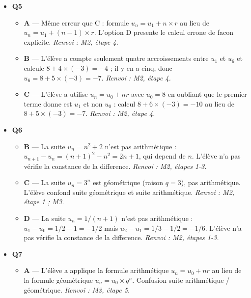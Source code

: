 \begin{itemize}
\begin{itemize}
    \item \textbf{B} — L'élève a donne une expression dependant de $n$ comme raison. La raison d'une suite arithmétique est un réel constant, pas une expression variable. \emph{Renvoi : M2, étape 3.}
    \item \textbf{D} — L'élève calcule $u_1=4 \times 1-7=-3$ et confond ce terme avec la raison. Or $u_0=-7$ et $u_1-u_0=-3-(-7)=4$. \emph{Renvoi : M2, étape 3.}
  \end{itemize}
  \item \textbf{Q5}
  \begin{itemize}
    \item \textbf{A} — Même erreur que C : formule $u_n = u_1 + n \times r$ au lieu de $u_n = u_1 + (n-1) \times r$. L'option D presente le calcul errone de facon explicite. \emph{Renvoi : M2, étape 4.}
    \item \textbf{B} — L'élève a compte seulement quatre accroissements entre $u_1$ et $u_6$ et calcule $8+4\times(-3)=-4$ ; il y en a cinq, donc $u_6=8+5\times(-3)=-7$. \emph{Renvoi : M2, étape 4.}
    \item \textbf{C} — L'élève a utilise $u_n = u_0 + nr$ avec $u_0 = 8$ en oubliant que le premier terme donne est $u_1$ et non $u_0$ : calcul $8 + 6 \times (-3) = -10$ au lieu de $8 + 5 \times (-3) = -7$. \emph{Renvoi : M2, étape 4.}
  \end{itemize}
  \item \textbf{Q6}
  \begin{itemize}
    \item \textbf{B} — La suite $u_n = n^2 + 2$ n'est pas arithmétique : $u_{n+1} - u_n = (n+1)^2 - n^2 = 2n+1$, qui depend de $n$. L'élève n'a pas vérifie la constance de la difference. \emph{Renvoi : M2, étapes 1-3.}
    \item \textbf{C} — La suite $u_n = 3^n$ est géométrique (raison $q = 3$), pas arithmétique. L'élève confond suite géométrique et suite arithmétique. \emph{Renvoi : M2, étape 1 ; M3.}
    \item \textbf{D} — La suite $u_n = 1/(n+1)$ n'est pas arithmétique : $u_1 - u_0 = 1/2 - 1 = -1/2$ mais $u_2 - u_1 = 1/3 - 1/2 = -1/6$. L'élève n'a pas vérifie la constance de la difference. \emph{Renvoi : M2, étapes 1-3.}
  \end{itemize}
  \item \textbf{Q7}
  \begin{itemize}
    \item \textbf{A} — L'élève a applique la formule arithmétique $u_n = u_0 + nr$ au lieu de la formule géométrique $u_n = u_0 \times q^n$. Confusion suite arithmétique / géométrique. \emph{Renvoi : M3, étape 5.}

\end{itemize}
\end{itemize}
